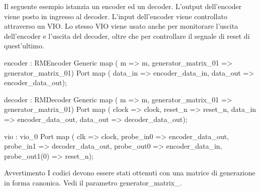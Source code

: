 Il seguente esempio istanzia un encoder ed un decoder. L'output dell'encoder viene posto in ingresso al decoder. L'input dell'encoder viene controllato attraverso un V\+I\+O. Lo stesso V\+I\+O viene usato anche per monitorare l'uscita dell'encoder e l'uscita del decoder, oltre che per controllare il segnale di reset di quest'ultimo. \begin{DoxyVerb}   encoder : RMEncoder
       Generic map (   m                   => m,
                       generator_matrix_01 => generator_matrix_01)
       Port map (      data_in             => encoder_data_in,
                       data_out            => encoder_data_out);

   decoder : RMDecoder
       Generic map (   m                   => m,
                       generator_matrix_01 => generator_matrix_01)
       Port map (      clock               => clock,
                       reset_n             => reset_n,
                       data_in             => encoder_data_out,
                       data_out            => decoder_data_out);

   vio : vio_0
       Port map (  clk             => clock,
                   probe_in0       => encoder_data_out,
                   probe_in1       => decoder_data_out,
                   probe_out0      => encoder_data_in,
                   probe_out1(0)   => reset_n);
\end{DoxyVerb}


\begin{DoxyWarning}{Avvertimento}
I codici devono essere stati ottenuti con una matrice di generazione in forma canonica. Vedi il parametro generator\+\_\+matrix\+\_.
\end{DoxyWarning}

